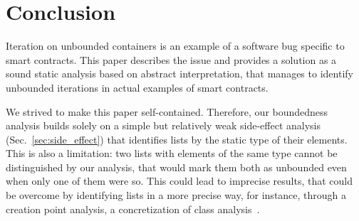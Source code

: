 \section{Conclusion}\label{sec:conclusion}
%
Iteration on unbounded containers is an example of a software bug
specific to smart contracts. This paper describes the issue and provides
a solution as a sound static analysis based on abstract interpretation,
that manages to identify unbounded iterations
in actual examples of smart contracts.

We strived to make this paper self-contained. Therefore, our boundedness
analysis builds solely on a simple but relatively weak side-effect analysis
(Sec.~\ref{sec:side_effect}) that identifies lists by the
static type of their elements. This is also a limitation: two lists with
elements of the same type cannot be distinguished by our analysis, that
would mark them both as unbounded even when only one of them were so.
This could lead to imprecise results, that could be overcome by identifying
lists in a more precise way, for instance, through a creation point analysis,
a concretization of class analysis~\cite{TipP00}.
